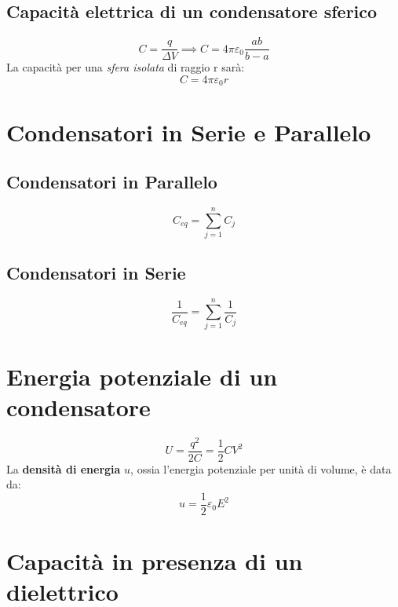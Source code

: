         \subsection*{Capacità elettrica di un condensatore sferico}
            \begin{equation*}
                C = \frac{q}{\Delta V} \implies C = 4\pi\varepsilon_0
                    \frac{ab}{b-a}
            \end{equation*}
        La capacità per una \textit{sfera isolata} di raggio r sarà:
            \begin{equation*}
                C = 4\pi\varepsilon_0r
            \end{equation*}
    
    \section*{Condensatori in Serie e Parallelo} 
        \subsection*{Condensatori in Parallelo}
            \begin{equation*}
                C_{eq} = \sum_{j = 1}^{n} C_j
            \end{equation*}

        \subsection*{Condensatori in Serie}
            \begin{equation*}
                \frac{1}{C_{eq}} = \sum_{j = 1}^{n} \frac{1}{C_j}
            \end{equation*}

    \section*{Energia potenziale di un condensatore}
        \begin{equation*}
            U = \frac{q^2}{2C} = \frac{1}{2}CV^2
        \end{equation*}
    La \textbf{densità di energia} $u$, ossia l'energia potenziale per unità di
     volume, è data da:
        \begin{equation*}
            u = \frac{1}{2}\varepsilon_0E^2
        \end{equation*}
    
    \section*{Capacità in presenza di un dielettrico}
        
